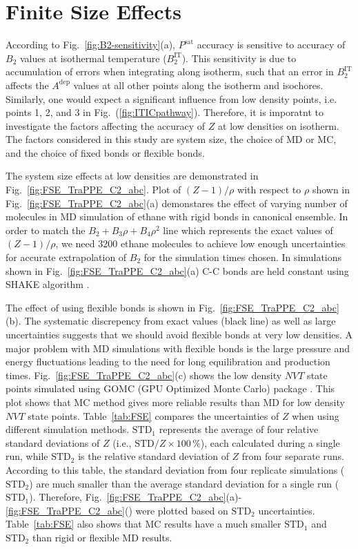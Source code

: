 \documentclass[5p,times]{elsarticle}
\begin{document}
\section{Finite Size Effects}\label{sec:FSE}
According to Fig.~\ref{fig:B2-sensitivity}(a), $P^{\mathrm{sat}}$ accuracy is sensitive to accuracy of $B_2$ values at isothermal temperature ($B_2^{\mathrm{IT}}$). This sensitivity is due to accumulation of errors when integrating along isotherm, such that an error in $B_2^{\mathrm{IT}}$ affects the $A^{\mathrm{dep}}$ values at all other points along the isotherm and isochores. Similarly, one would expect a significant influence from low density points, i.e. points 1, 2, and 3 in Fig.~(\ref{fig:ITICpathway}). Therefore, it is imporatnt to investigate the factors affecting the accuracy of $Z$ at low densities on isotherm. The factors considered in this study are system size, the choice of MD or MC, and the choice of fixed bonds or flexible bonds. 

The system size effects at low densities are demonstrated in Fig.~\ref{fig:FSE_TraPPE_C2_abc}. Plot of $(Z-1)/\rho$ with respect to $\rho$ shown in Fig.~\ref{fig:FSE_TraPPE_C2_abc}(a) demonstares the effect of varying number of molecules in MD simulation of ethane with rigid bonds in canonical ensemble. In order to match the $B_2+B_3 \rho+B_4 \rho^2$ line which represents the exact values of $(Z-1)/\rho$, we need 3200 ethane molecules to achieve low enough uncertainties for accurate extrapolation of $B_2$ for the simulation times chosen. In simulations shown in Fig.~\ref{fig:FSE_TraPPE_C2_abc}(a) C-C bonds are held constant using SHAKE algorithm \cite{Ryckaert1977}. 

The effect of using flexible bonds is shown in Fig.~\ref{fig:FSE_TraPPE_C2_abc}(b). The systematic discrepency from exact values (black line) as well as large uncertainties suggests that we should avoid flexible bonds at very low densities. A major problem with MD simulations with flexible bonds is the large pressure and energy fluctuations leading to the need for long equilibration and production times.
Fig.~\ref{fig:FSE_TraPPE_C2_abc}(c) shows the low density $NVT$ state points simulated using GOMC (GPU Optimized Monte Carlo) package \cite{Mick2013}. This plot shows that MC method gives more reliable results than MD for low density $NVT$ state points. Table~\ref{tab:FSE} compares the uncertainties of $Z$ when using different simulation methods. $\mathrm{STD}_1$ represents the average of four relative standard deviations of $Z$ (i.e., $\mathrm{STD}/Z\times100 \, \%$), each calculated during a single run, while $\mathrm{STD}_2$ is the relative standard deviation of $Z$ from four separate runs. According to this table, the standard deviation from four replicate simulations ($\mathrm{STD}_2$) are much smaller than the average standard deviation for a single run ($\mathrm{STD}_1$). Therefore, Fig.~\ref{fig:FSE_TraPPE_C2_abc}(a)-\ref{fig:FSE_TraPPE_C2_abc}() were plotted based on $\mathrm{STD}_2$ uncertainties. Table~\ref{tab:FSE} also shows that MC results have a much smaller $\mathrm{STD}_1$ and $\mathrm{STD}_2$ than rigid or flexible MD results. 
\end{document}
